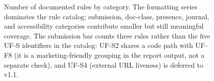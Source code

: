 \begin{figure}[h]
\centering
{}
\caption{Number of documented rules by category. The formatting series dominates the rule catalog; submission, doc-class, presence, journal, and accessibility categories contribute smaller but still meaningful coverage. The submission bar counts three rules rather than the five UF-S identifiers in the catalog: UF-S2 shares a code path with UF-F8 (it is a marketing-friendly grouping in the report output, not a separate check), and UF-S4 (external URL liveness) is deferred to v1.1.}
\label{fig:rule-counts}
\end{figure}
